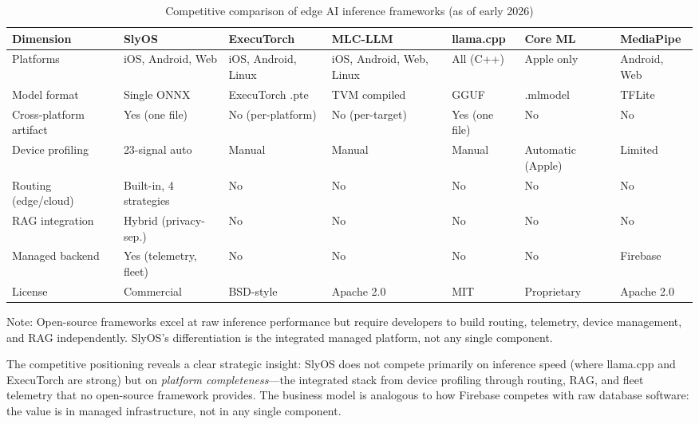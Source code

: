 \documentclass[12pt, letterpaper, twoside]{report}
\begin{document}
\begin{table}[H]
\centering
\caption[Competitive comparison of edge AI inference frameworks]{Competitive comparison of edge AI inference frameworks (as of early 2026)}
\label{tab:competitive_matrix}
{\scriptsize
\begin{tabularx}{\textwidth}{@{}lXXXXXX@{}}
\toprule
\textbf{Dimension} & \textbf{SlyOS} & \textbf{ExecuTorch} & \textbf{MLC-LLM} & \textbf{llama.cpp} & \textbf{Core ML} & \textbf{MediaPipe} \\
\midrule
Platforms & iOS, Android, Web & iOS, Android, Linux & iOS, Android, Web, Linux & All (C++) & Apple only & Android, Web \\
\addlinespace
Model format & Single ONNX & ExecuTorch .pte & TVM compiled & GGUF & .mlmodel & TFLite \\
\addlinespace
Cross-platform artifact & Yes (one file) & No (per-platform) & No (per-target) & Yes (one file) & No & No \\
\addlinespace
Device profiling & 23-signal auto & Manual & Manual & Manual & Automatic (Apple) & Limited \\
\addlinespace
Routing (edge/cloud) & Built-in, 4 strategies & No & No & No & No & No \\
\addlinespace
RAG integration & Hybrid (privacy-sep.) & No & No & No & No & No \\
\addlinespace
Managed backend & Yes (telemetry, fleet) & No & No & No & No & Firebase \\
\addlinespace
License & Commercial & BSD-style & Apache 2.0 & MIT & Proprietary & Apache 2.0 \\
\bottomrule
\end{tabularx}
}
\vspace{4pt}
{\scriptsize Note: Open-source frameworks excel at raw inference performance but require developers to build routing, telemetry, device management, and RAG independently. SlyOS's differentiation is the integrated managed platform, not any single component.}
\end{table}

The competitive positioning reveals a clear strategic insight: SlyOS does not compete primarily on inference speed (where llama.cpp and ExecuTorch are strong) but on \textit{platform completeness}---the integrated stack from device profiling through routing, RAG, and fleet telemetry that no open-source framework provides. The business model is analogous to how Firebase competes with raw database software: the value is in managed infrastructure, not in any single component.
\end{document}

